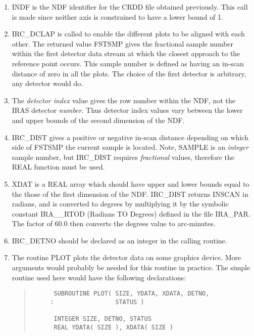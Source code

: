 \begin{enumerate}

\item INDF is the NDF identifier for the CRDD file obtained previously. This
call is made since neither axis is constrained to have a lower bound of 1.

\item IRC\_DCLAP is called to enable the different plots to be aligned with
each other. The returned value FSTSMP gives the fractional sample number within
the first detector data stream at which the closest approach to the reference
point occurs. This sample number is defined as having an in-scan distance of
zero in all the plots. The choice of the first detector is arbitrary, any
detector would do.

\item The {\em detector index} value gives the row number within the NDF, not
the IRAS detector {\em number}. Thus detector index values vary between the
lower and upper bounds of the second dimension of the NDF.

\item IRC\_DIST gives a positive or negative in-scan distance depending on
which side of FSTSMP the current sample is located. Note, SAMPLE is an
{\em integer} sample number, but IRC\_DIST requires {\em fractional} values,
therefore the REAL function must be used.

\item XDAT is a REAL array which should have upper and lower bounds equal to the
those of the first dimension of the NDF. IRC\_DIST returns INSCAN in radians,
and is converted to degrees by multiplying it by the symbolic constant
IRA\_\_RTOD (Radians TO Degrees) defined in the file IRA\_PAR. The factor of
60.0 then converts the degrees value to arc-minutes.

\item IRC\_DETNO should be declared as an integer in the calling routine.

\item The routine PLOT plots the detector data on some graphics device. More
arguments would probably be needed for this routine in practice. The simple
routine used here would have the following declarations:

\begin{quote}
\begin{tabbing}

\verb#      SUBROUTINE PLOT( SIZE, YDATA, XDATA, DETNO,      #\\
\verb#     :                 STATUS )                        #\\
\verb#                                                       #\\
\verb#      INTEGER SIZE, DETNO, STATUS                      #\\
\verb#      REAL YDATA( SIZE ), XDATA( SIZE )                #\\


\end{tabbing}
\end{quote}
\end{enumerate}
